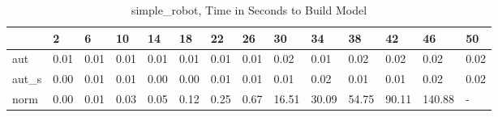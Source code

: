 \begin{table}
\caption{simple_robot, Time in Seconds to Build Model}
\label{simple_robot_model_time}
\begin{tabular}{llllllllllllll}
\toprule
 & 2 & 6 & 10 & 14 & 18 & 22 & 26 & 30 & 34 & 38 & 42 & 46 & 50 \\
\midrule
aut & 0.01 & 0.01 & 0.01 & 0.01 & 0.01 & 0.01 & 0.01 & 0.02 & 0.01 & 0.02 & 0.02 & 0.02 & 0.02 \\
aut_s & 0.00 & 0.01 & 0.01 & 0.00 & 0.00 & 0.01 & 0.01 & 0.01 & 0.02 & 0.01 & 0.01 & 0.02 & 0.02 \\
norm & 0.00 & 0.01 & 0.03 & 0.05 & 0.12 & 0.25 & 0.67 & 16.51 & 30.09 & 54.75 & 90.11 & 140.88 & - \\
\bottomrule
\end{tabular}
\end{table}
